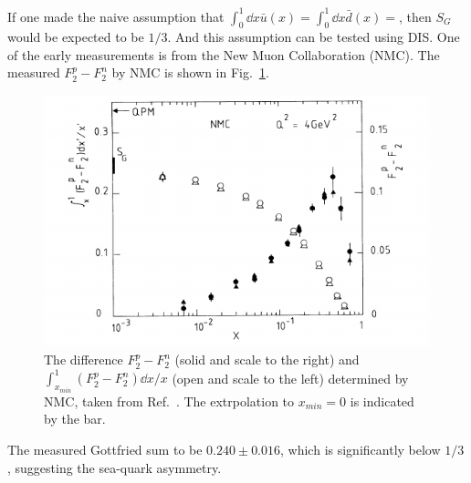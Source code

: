 If one made the naive assumption that $\int_0^1\dd{x} \bar{u}\left(x\right)=\int_0^1\dd{x} \bar{d}\left(x\right)=$,
then $S_G$ would be expected to be $1/3$. And this assumption can be tested using DIS.
One of the early measurements is from the New Muon Collaboration (NMC)\cite{amaudruz1991}. 
The measured $F_2^p-F_2^n$ by NMC is shown in Fig.\ \ref{fig:NMC_Gottfried}. 
\begin{figure}
	\centering
	\includegraphics[width=0.7\linewidth]{images/Gottfried}
	\caption{The difference $F_2^p -F_2^n$ (solid and scale to the right) and 
		$\int_{x_{min}}^1 (F_2^p-F_2^n)\dd{x}/x$ (open and scale to the left) 
		determined by NMC, taken from Ref.\ \cite{amaudruz1991}. The extrpolation
		to $x_{min}=0$ is indicated by the bar.}
	\label{fig:NMC_Gottfried}
\end{figure}
The measured Gottfried sum to be $0.240 \pm 0.016$, which is significantly below 
$1/3$, suggesting the sea-quark asymmetry.


